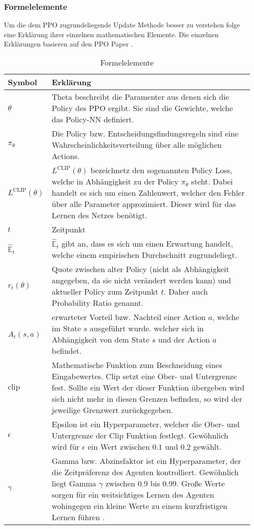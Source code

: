 \subsubsection{Formelelemente}
Um die dem PPO zugrundeliegende Update Methode besser zu verstehen folge eine Erklärung ihrer einzelnen mathematischen Elemente.
Die einzelnen Erklärungen basieren auf den PPO Paper \cite{PPO}.
\begin{longtable}[h]{|p{4cm}|p{\linewidth - 5cm}|}
	\caption{Formelelemente}
	\label{tab:Formelelemente} 
	\endfirsthead
	\endhead
	\hline
	Symbol & Erklärung \\
	\hline
	$\theta$ & Theta beschreibt die Paramenter aus denen sich die Policy des PPO ergibt. Sie sind die Gewichte, welche das Policy-NN definiert. \\
	\hline
	$\pi_{\theta}$ & Die Policy bzw. Entscheidungsfindungsregeln sind eine Wahrscheinlichkeitsverteilung über alle möglichen Actions. \cite{Sutton1998} \\
	\hline
	$L^\text{CLIP} (\theta)$ & $L^\text{CLIP} (\theta)$ bezeichnetz den sogenannten Policy Loss, welche in Abhängigkeit zu der Policy $\pi_{\theta}$ steht. Dabei handelt es sich um einen Zahlenwert, welcher den Fehler über alle Parameter approzimiert. Dieser wird für das Lernen des Netzes benötigt. \\
	\hline
	$t$ & Zeitpunkt \\
	\hline
	$\mathbb{\hat{E}}_{t}$ & $\mathbb{\hat{E}}_{t}$ gibt an, dass es sich um einen Erwartung handelt, welche einem empirischen Durchschnitt zugrundeliegt. \\
	\hline
	$r_{t}(\theta)$ & Quote zwischen alter Policy (nicht als Abhängigkeit angegeben, da sie nicht verändert werden kann) und aktueller Policy zum Zeitpunkt $t$. Daher auch Probability Ratio genannt. \\
	\hline
	$\hat{A}_{t}(s, a)$ & erwarteter Vorteil bzw. Nachteil einer Action $a$, welche im State $s$ ausgeführt wurde. welcher sich in Abhängigkeit von dem State $s$ und der Action $a$ befindet. \\
	\hline
	$\text{clip}$ & Mathematische Funktion zum Beschneidung eines Eingabewertes. Clip setzt eine Ober- und Untergrenze fest. Sollte ein Wert der dieser Funktion übergeben wird sich nicht mehr in diesen Grenzen befinden, so wird der jeweilige Grenzwert zurückgegeben. \\
	\hline
	$\epsilon$ & Epsilon ist ein Hyperparameter, welcher die Ober- und Untergrenze der Clip Funktion festlegt. Gewöhnlich wird für $\epsilon$ ein Wert zwischen $0.1$ und $0.2$ gewählt. \\
	\hline
	$\gamma$ & Gamma bzw. Abzinsfaktor ist ein Hyperparameter, der die Zeitpräferenz des Agenten kontrolliert. Gewöhnlich liegt Gamma $\gamma$ zwischen 0.9 bis 0.99. Große Werte sorgen für ein weitsichtiges Lernen des Agenten wohingegen ein kleine Werte zu einem kurzfristigen Lernen führen \cite{Sutton1998}. \\
	\hline
\end{longtable}

